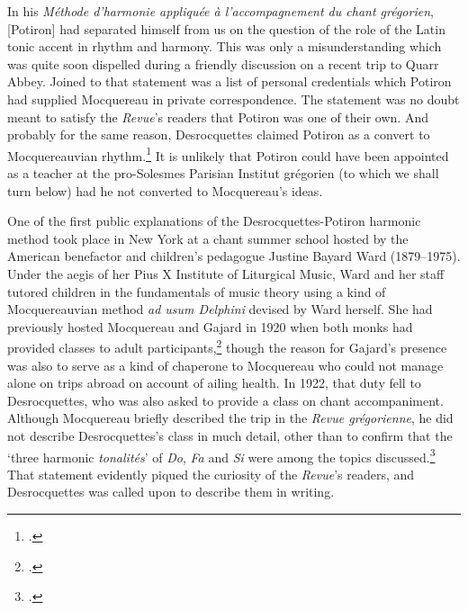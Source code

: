   {\cite[Introduction to ][121]{Potironaccentmusicalmoderne1922}}
{In his \emph{Méthode d'harmonie appliquée à l'accompagnement du chant grégorien}, [Potiron] had separated himself from us on the question of the role of the Latin tonic accent in rhythm and harmony. This was only a misunderstanding which was quite soon dispelled during a friendly discussion on a recent trip to Quarr Abbey.}
\noindent
Joined to that statement was a list of personal credentials which Potiron had supplied Mocquereau in private correspondence.
The statement was no doubt meant to satisfy the \emph{Revue}'s readers that Potiron was one of their own.
And probably for the same reason, Desrocquettes claimed Potiron as a convert to Mocquereauvian rhythm.\footcite[155]{DesrocquettesCoursaccompagnementInstitut1924}
It is unlikely that Potiron could have been appointed as a teacher at the pro-Solesmes Parisian Institut grégorien (to which we shall turn below) had he not converted to Mocquereau's ideas.

One of the first public explanations of the Desrocquettes-Potiron harmonic method took place in New York at a chant summer school hosted by the American benefactor and children's pedagogue Justine Bayard Ward (1879--1975).
Under the aegis of her Pius X Institute of Liturgical Music, Ward and her staff tutored children in the fundamentals of music theory using a kind of Mocquereauvian method \emph{ad usum Delphini} devised by Ward herself.
She had previously hosted Mocquereau and Gajard in 1920 when both monks had provided classes to adult participants,\footcite[104--105]{HalavoyageNewYorkaisDom2019} though the reason for Gajard's presence was also to serve as a kind of chaperone to Mocquereau who could not manage alone on trips abroad on account of ailing health.
In 1922, that duty fell to Desrocquettes, who was also asked to provide a class on chant accompaniment.
Although Mocquereau briefly described the trip in the \emph{Revue grégorienne}, he did not describe Desrocquettes's class in much detail, other than to confirm that the `three harmonic \emph{tonalités}' of \emph{Do}, \emph{Fa} and \emph{Si}\kern 1pt\flat{} were among the topics discussed.\footcite[237]{MocquereauEtatsUnisAmeriquecours1922}
That statement evidently piqued the curiosity of the \emph{Revue}'s readers, and Desrocquettes was called upon to describe them in writing.

